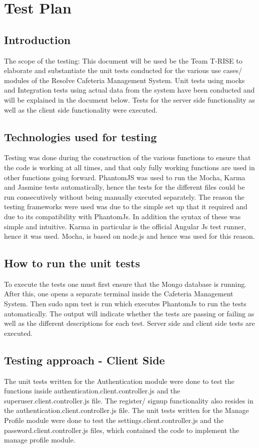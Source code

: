 \documentclass[a4paper,12pt]{report}
\begin{document}
\section{Test Plan}

\subsection{Introduction}
The scope of the testing: This document will be used be the Team T-RISE to elaborate and substantiate the unit tests conducted for the various use cases/ modules of the Resolve Cafeteria Management System. Unit tests using mocks and Integration tests using actual data from the system have been conducted and will be explained in the document below. Tests for the server side functionality as well as the client side functionality were executed.

\subsection{Technologies used for testing}
Testing was done during the construction of the various functions to ensure that the code is working at all times, and that only fully working functions are used in other functions going forward. PhantomJS was used to run the Mocha, Karma and Jasmine tests automatically, hence the tests for the different files could be run consecutively without being manually executed separately. The reason the testing frameworks were used was due to the simple set up that it required and due to its compatibility with PhantomJs. In addition the syntax of these was simple and intuitive.  Karma in particular is the official Angular Js test runner, hence it was used. Mocha, is based on node.js and hence was used for this reason. 
\\
\subsection{How to run the unit tests}
To execute the tests one must first ensure that the Mongo database is running. After this, one opens a separate terminal inside the Cafeteria Management System. Then sudo npm test is run which executes PhantomJs to run the tests automatically.  The output will indicate whether the tests are passing or failing as well as the different descriptions for each test. Server side and client side tests are executed.

\subsection{Testing approach - Client Side}
The unit tests written for the Authentication module were done to test the functions inside authentication.client.controller.js and the superuser.client.controller.js file.  The register/ signup functionality also resides in the authentication.client.controller.js file. The unit tests written for the Manage Profile module were done to test the settings.client.controller.js and the password.client.controller.js files, which contained the code to implement the manage profile module.
 
\end{document}
